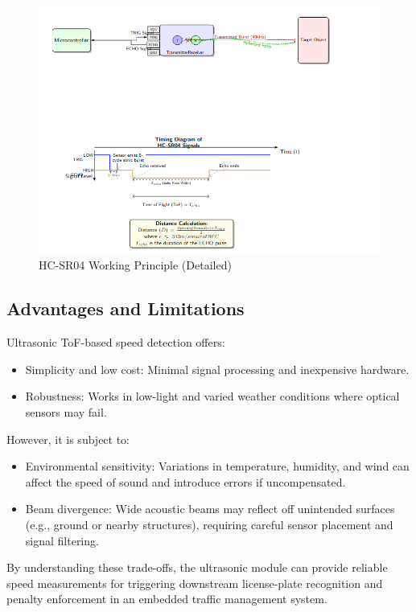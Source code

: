 \begin{figure}[htbp]
    \centering
    \includegraphics[width=1.0\textwidth]{figures/HC-SR04.png}
    \caption{HC-SR04 Working Principle (Detailed)}
    \label{fig:hc-sr04-detailed}
\end{figure}

\newpage
\subsection*{Advantages and Limitations}
Ultrasonic ToF-based speed detection offers:
\begin{itemize}
  \item {Simplicity and low cost}: Minimal signal processing and inexpensive hardware.
  \item {Robustness}: Works in low-light and varied weather conditions where optical sensors may fail.
\end{itemize}
However, it is subject to:
\begin{itemize}
  \item {Environmental sensitivity}: Variations in temperature, humidity, and wind can affect the speed of sound and introduce errors if uncompensated.
  \item {Beam divergence}: Wide acoustic beams may reflect off unintended surfaces (e.g., ground or nearby structures), requiring careful sensor placement and signal filtering.
\end{itemize}
By understanding these trade-offs, the ultrasonic module can provide reliable speed measurements for triggering downstream license-plate recognition and penalty enforcement in an embedded traffic management system.



